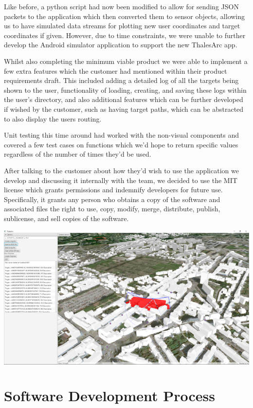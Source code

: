 \documentclass{l3proj}
\begin{document}
Like before, a python script had now been modified to allow for sending JSON packets to the application which then converted them to sensor objects, allowing us to have simulated data streams for plotting new user coordinates and target coordinates if given. However, due to time constraints, we were unable to further develop the Android simulator application to support the new ThalesArc app.

Whilst also completing the minimum viable product we were able to implement a few extra features which the customer had mentioned within their product requirements draft. This included adding a detailed log of all the targets being shown to the user, functionality of loading, creating, and saving these logs within the user's directory, and also additional features which can be further developed if wished by the customer, such as having target paths, which can be abstracted to also display the users routing.

Unit testing this time around had worked with the non-visual components and covered a few test cases on functions which we'd hope to return specific values regardless of the number of times they'd be used.

After talking to the customer about how they'd wish to use the application we develop and discussing it internally with the team, we decided to use the MIT license\cite{mit} which grants permissions and indemnify developers for future use. Specifically, it grants any person who obtains a copy of the software and associated files the right to use, copy, modify, merge, distribute, publish, sublicense, and sell copies of the software.

\includegraphics[width=\textwidth]{ThalesARC2}


\section{Software Development Process}
\end{document}
